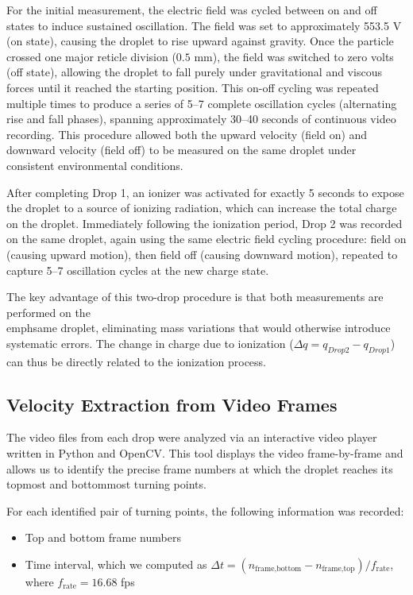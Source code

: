 \documentclass[11pt]{article}
\begin{document}
For the initial measurement, the electric field was cycled between on and off states to induce sustained oscillation. The field was set to approximately 553.5 V (on state), causing the droplet to rise upward against gravity. Once the particle crossed one major reticle division ($0.5$ mm), the field was switched to zero volts (off state), allowing the droplet to fall purely under gravitational and viscous forces until it reached the starting position. This on-off cycling was repeated multiple times to produce a series of 5--7 complete oscillation cycles (alternating rise and fall phases), spanning approximately 30--40 seconds of continuous video recording. This procedure allowed both the upward velocity (field on) and downward velocity (field off) to be measured on the same droplet under consistent environmental conditions.

After completing Drop 1, an ionizer was activated for exactly 5 seconds to expose the droplet to a source of ionizing radiation, which can increase the total charge on the droplet. Immediately following the ionization period, Drop 2 was recorded on the same droplet, again using the same electric field cycling procedure: field on (causing upward motion), then field off (causing downward motion), repeated to capture 5--7 oscillation cycles at the new charge state.

The key advantage of this two-drop procedure is that both measurements are performed on the \\emph{same droplet}, eliminating mass variations that would otherwise introduce systematic errors. The change in charge due to ionization ($\Delta q = q_{Drop 2} - q_{Drop 1}$) can thus be directly related to the ionization process.

\subsection{Velocity Extraction from Video Frames}

The video files from each drop were analyzed via an interactive video player written in Python and OpenCV. This tool displays the video frame-by-frame and allows us to identify the precise frame numbers at which the droplet reaches its topmost and bottommost turning points.

For each identified pair of turning points, the following information was recorded:
\begin{itemize}
    \item Top and bottom frame numbers
    \item Time interval, which we computed as $\Delta t = (n_{\text{frame,bottom}} - n_{\text{frame,top}}) / f_{\text{rate}}$, where $f_{\text{rate}} = 16.68$ fps
\end{itemize}
\end{document}
